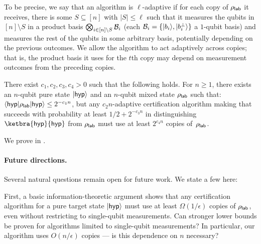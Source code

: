 To be precise, we say that an algorithm is $\ell$-adaptive if for each copy of $\rho_{\mathsf{lab}}$ it receives, there is some $S\subseteq[n]$ with $|S|\leq \ell$ such that it measures the qubits in $[n]\setminus S$ in a product basis $\bigotimes_{i\in[n]\setminus S}\mathcal{B}_i$ (each $\mathcal{B}_i = \{\lvert\smash{b_i}\rangle, \lvert\smash{b_i^\bot}\rangle\}$ a $1$-qubit basis) and measures the rest of the qubits in some arbitrary basis, potentially depending on the previous outcomes.  We allow the algorithm to act adaptively across copies; that is, the product basis it uses for the $t$th copy may depend on measurement outcomes from the preceding copies.
\begin{theorem}\label{prop:lower bound}
    There exist $c_1, c_2, c_3 ,c_4> 0$ such that the following holds. For $n\geq1$, there exists an $n$-qubit pure state $\lvert\mathsf{hyp}\rangle$ and an $n$-qubit mixed state $\rho_{\mathsf{lab}}$ such that: $\langle\mathsf{hyp}\rvert\rho_{\mathsf{lab}}\lvert\mathsf{hyp}\rangle\leq 2^{-c_1n}$, but any $c_2n$-adaptive certification algorithm making that succeeds with probability at least $1/2 + 2^{-c_3 n}$ in distinguishing $\ketbra{\tar}{\tar}$ from $\rho_{\mathsf{lab}}$ must use at least $2^{c_4 n}$ copies of~$\rho_{\mathsf{lab}}$. 
\end{theorem}
We prove  in .


\paragraph{Future directions.} Several natural questions remain open for future work. We state a few here:

First, a basic information-theoretic argument shows that any certification algorithm for a pure target state $\lvert\mathsf{hyp}\rangle$ must use at least $\Omega(1/\epsilon)$ copies of $\rho_{\mathsf{lab}}$, even without restricting to single-qubit measurements. Can stronger lower bounds be proven for algorithms limited to single-qubit measurements? In particular, our algorithm uses $O(n/\epsilon)$ copies --- is this dependence on $n$ necessary?

